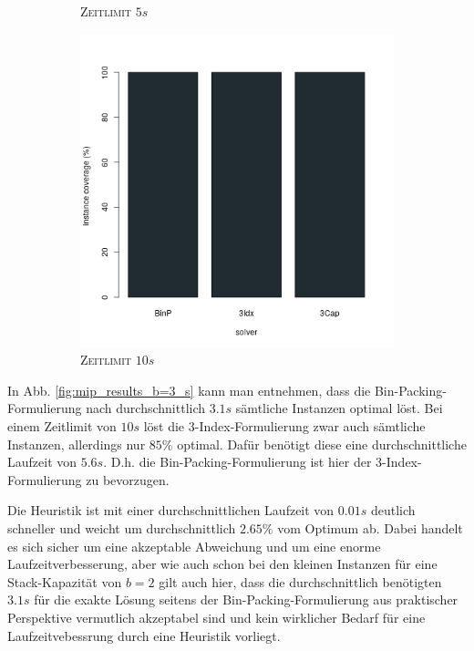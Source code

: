 \begin{figure}[H]
\begin{subfigure}[b]{0.3\textwidth}
\caption{\textsc{Zeitlimit} $5s$}
\label{}
\end{subfigure}
\hfill
\begin{subfigure}[b]{0.3\textwidth}
\centering
\includegraphics[width=1.2\textwidth]{img/solver_instance_coverage_b=3_s_10s.png}
\caption{\textsc{Zeitlimit} $10s$}
\label{}
\end{subfigure}

\caption{}
\label{fig:instance_coverage_b=3_s}
\end{figure}

In Abb. \ref{fig:mip_results_b=3_s} kann man entnehmen, dass die Bin-Packing-Formulierung nach durchschnittlich
$3.1s$ sämtliche Instanzen optimal löst. Bei einem Zeitlimit von $10s$ löst die 3-Index-Formulierung zwar auch
sämtliche Instanzen, allerdings nur $85 \%$ optimal. Dafür benötigt diese eine durchschnittliche Laufzeit von
$5.6s$. D.h. die Bin-Packing-Formulierung ist hier der 3-Index-Formulierung zu bevorzugen.

Die Heuristik ist mit einer durchschnittlichen Laufzeit von $0.01s$ deutlich schneller und weicht um
durchschnittlich $2.65 \%$ vom Optimum ab. Dabei handelt es sich sicher um eine akzeptable Abweichung
und um eine enorme Laufzeitverbesserung, aber wie auch schon bei den kleinen Instanzen für eine Stack-Kapazität
von $b = 2$ gilt auch hier, dass die durchschnittlich benötigten $3.1s$ für die exakte Lösung seitens der
Bin-Packing-Formulierung aus praktischer Perspektive vermutlich akzeptabel sind und kein wirklicher Bedarf
für eine Laufzeitvebessrung durch eine Heuristik vorliegt.

